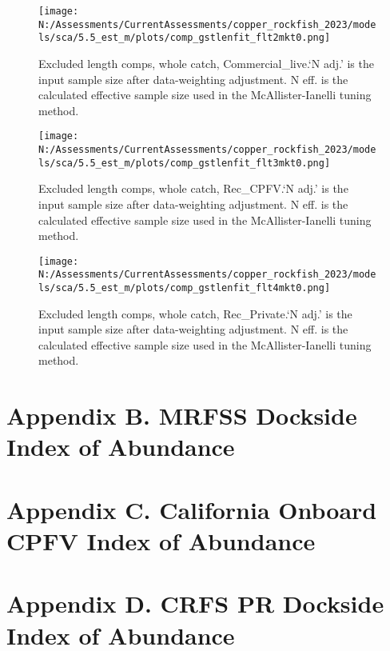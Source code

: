 \documentclass[11pt,
  english,
  letterpaper,
]{article}
\begin{document}
\begin{figure}
\centering
\texttt{[image: N:/Assessments/CurrentAssessments/copper\_rockfish\_2023/models/sca/5.5\_est\_m/plots/comp\_gstlenfit\_flt2mkt0.png]}
\caption{Excluded length comps, whole catch, Commercial\_live.`N adj.' is the input sample size after data-weighting adjustment. N eff. is the calculated effective sample size used in the McAllister-Ianelli tuning method.\label{fig:comp_gstlenfit_flt2mkt0}}
\end{figure}

\begin{figure}
\centering
\texttt{[image: N:/Assessments/CurrentAssessments/copper\_rockfish\_2023/models/sca/5.5\_est\_m/plots/comp\_gstlenfit\_flt3mkt0.png]}
\caption{Excluded length comps, whole catch, Rec\_CPFV.`N adj.' is the input sample size after data-weighting adjustment. N eff. is the calculated effective sample size used in the McAllister-Ianelli tuning method.\label{fig:comp_gstlenfit_flt3mkt0}}
\end{figure}

\begin{figure}
\centering
\texttt{[image: N:/Assessments/CurrentAssessments/copper\_rockfish\_2023/models/sca/5.5\_est\_m/plots/comp\_gstlenfit\_flt4mkt0.png]}
\caption{Excluded length comps, whole catch, Rec\_Private.`N adj.' is the input sample size after data-weighting adjustment. N eff. is the calculated effective sample size used in the McAllister-Ianelli tuning method.\label{fig:comp_gstlenfit_flt4mkt0}}
\end{figure}

\newpage

\hypertarget{mrfss-index}{%
\section{Appendix B. MRFSS Dockside Index of Abundance}\label{mrfss-index}}

\hypertarget{onboard-cpfv-index}{%
\section{Appendix C. California Onboard CPFV Index of Abundance}\label{onboard-cpfv-index}}

\hypertarget{crfs-pr-index}{%
\section{Appendix D. CRFS PR Dockside Index of Abundance}\label{crfs-pr-index}}
\end{document}
